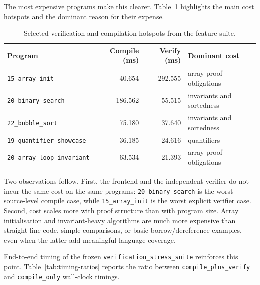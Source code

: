 The most expensive programs make this clearer. Table~\ref{tab:hotspots}
highlights the main cost hotspots and the dominant reason for their expense.

\begin{table}[h]
  \centering
  \small
  \begin{tabular}{l r r l}
    \hline
    \textbf{Program}                  & \textbf{Compile (ms)} & \textbf{Verify (ms)} & \textbf{Dominant cost}    \\
    \hline
    \texttt{15\_array\_init}          & 40.654                & 292.555              & array proof obligations   \\
    \texttt{20\_binary\_search}       & 186.562               & 55.515               & invariants and sortedness \\
    \texttt{22\_bubble\_sort}         & 75.180                & 37.640               & invariants and sortedness \\
    \texttt{19\_quantifier\_showcase} & 36.185                & 24.616               & quantifiers               \\
    \texttt{20\_array\_loop\_invariant} & 63.534              & 21.393               & array proof obligations   \\
    \hline
  \end{tabular}
  \caption{Selected verification and compilation hotspots from the feature
    suite.}
  \label{tab:hotspots}
\end{table}

Two observations follow. First, the frontend and the independent verifier do
not incur the same cost on the same programs: \texttt{20\_binary\_search} is
the worst source-level compile case, while \texttt{15\_array\_init} is the
worst explicit verifier case. Second, cost scales more with proof structure
than with program size. Array initialisation and invariant-heavy algorithms are
much more expensive than straight-line code, simple comparisons, or basic
borrow/dereference examples, even when the latter add meaningful language
coverage.

End-to-end timing of the frozen \texttt{verification\_stress\_suite} reinforces
this point. Table~\ref{tab:timing-ratios} reports the ratio between
\texttt{compile\_plus\_verify} and \texttt{compile\_only} wall-clock timings.

